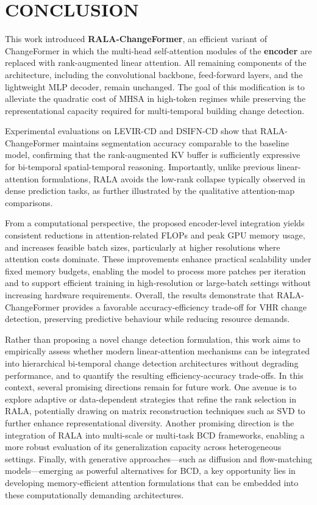 \section{\uppercase{Conclusion}} 
\label{sec:conclusion}

This work introduced \textbf{RALA-ChangeFormer}, an efficient variant of ChangeFormer in which the multi-head self-attention modules of the \textbf{encoder} are replaced with rank-augmented linear attention. All remaining components of the architecture, including the convolutional backbone, feed-forward layers, and the lightweight MLP decoder, remain unchanged. The goal of this modification is to alleviate the quadratic cost of MHSA in high-token regimes while preserving the representational capacity required for multi-temporal building change detection.

Experimental evaluations on LEVIR-CD and DSIFN-CD show that RALA-ChangeFormer maintains segmentation accuracy comparable to the baseline model, confirming that the rank-augmented KV buffer is sufficiently expressive for bi-temporal spatial-temporal reasoning. Importantly, unlike previous linear-attention formulations, RALA avoids the low-rank collapse typically observed in dense prediction tasks, as further illustrated by the qualitative attention-map comparisons.

From a computational perspective, the proposed encoder-level integration yields consistent reductions in attention-related FLOPs and peak GPU memory usage, and increases feasible batch sizes, particularly at higher resolutions where attention costs dominate. These improvements enhance practical scalability under fixed memory budgets, enabling the model to process more patches per iteration and to support efficient training in high-resolution or large-batch settings without increasing hardware requirements. Overall, the results demonstrate that RALA-ChangeFormer provides a favorable accuracy-efficiency trade-off for VHR change detection, preserving predictive behaviour while reducing resource demands.

Rather than proposing a novel change detection formulation, this work aims to empirically assess whether modern linear-attention mechanisms can be integrated into hierarchical bi-temporal change detection architectures without degrading performance, and to quantify the resulting efficiency-accuracy trade-offs. In this context, several promising directions remain for future work. One avenue is to explore adaptive or data-dependent strategies that refine the rank selection in RALA, potentially drawing on matrix reconstruction techniques such as SVD to further enhance representational diversity. Another promising direction is the integration of RALA into multi-scale or multi-task BCD frameworks, enabling a more robust evaluation of its generalization capacity across heterogeneous settings. Finally, with generative approaches—such as diffusion and flow-matching models—emerging as powerful alternatives for BCD, a key opportunity lies in developing memory-efficient attention formulations that can be embedded into these computationally demanding architectures.